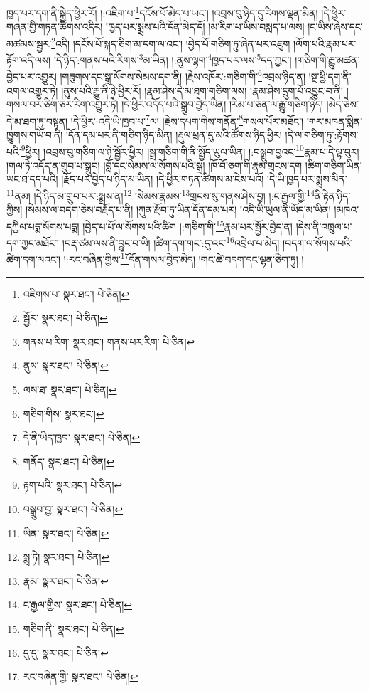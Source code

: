 ཁྱད་པར་དག་ནི་སྐྱེད་ཕྱིར་རོ། །:འཇིག་པ་\footnote{འཇིགས་པ་  སྣར་ཐང་།  པེ་ཅིན། }དངོས་པོ་མེད་པ་ཡང་། །འབྲས་བུ་ཉིད་དུ་རིགས་ལྡན་མིན། །དེ་ཕྱིར་གཞན་གྱི་གཏན་ཚིགས་འདིར། །ཁྱད་པར་སྨྲས་པའི་དོན་མེད་དོ། །མ་རིག་པ་ཡིས་བསླད་པ་ལས། །ང་ཡིས་ཞེས་དང་མཚམས་སྦྱར་\footnote{སྦྱོར་  སྣར་ཐང་།  པེ་ཅིན། }འདི། །དངོས་པོ་སྐད་ཅིག་མ་དག་ལ་འང་། །བྱེད་པོ་གཅིག་ཏུ་ཞེན་པར་འཇུག །ལོག་པའི་རྣམ་པར་རྟོག་འདི་ལས། །དེ་ཉིད་:གནས་པའི་རིགས་\footnote{གནས་པ་རིག་  སྣར་ཐང་། གནས་པར་རིག་  པེ་ཅིན། }མ་ཡིན། །:ནུས་ལྷག་\footnote{ནུས་  སྣར་ཐང་།  པེ་ཅིན། }ཁྱད་པར་ལས་\footnote{ལས་ཐ་  སྣར་ཐང་།  པེ་ཅིན། }དད་ཀྱང་། །གཅིག་གི་རྒྱུ་མཚན་བྱེད་པར་འགྱུར། །གཟུགས་དང་སྒྲ་སོགས་སེམས་དག་ནི། །རྗེས་འཁོར་:གཅིག་གི་\footnote{གཅིག་གིས་  སྣར་ཐང་། }འབྲས་ཉིད་ན། །སྔ་ཕྱི་དག་ནི་འགལ་འགྱུར་ཏེ། །ནུས་པའི་རྒྱུ་ནི་ཉེ་ཕྱིར་རོ། །རྣམ་ཤེས་དེ་མ་ཐག་གཅིག་ལས། །རྣམ་ཤེས་དྲུག་པོ་འབྱུང་བ་ནི། །གསལ་བར་ཅིག་ཅར་རིག་འགྱུར་ཏེ། །དེ་ཕྱིར་འདོད་པའི་སྒྲུབ་བྱེད་ཡིན། །རིམ་པ་ཅན་ལ་རྒྱུ་གཅིག་ཉིད། །མེད་ཅེས་དེ་མ་ཐག་ཏུ་བསྟན། །དེ་ཕྱིར་:འདི་ཡི་ཁྱབ་པ་\footnote{དེ་ནི་ཡིད་ཁྱབ་  སྣར་ཐང་།  པེ་ཅིན། }ལ། །རྗེས་དཔག་གིས་གནོན་\footnote{གནོད་  སྣར་ཐང་།  པེ་ཅིན། }གསལ་པོར་མཐོང་། །གར་མཁན་སྨིན་ཁྱུགས་གཡོ་བ་ནི། །དོན་དམ་པར་ནི་གཅིག་ཉིད་མིན། །རྡུལ་ཕྲན་དུ་མའི་ཚོགས་ཉིད་ཕྱིར། །དེ་ལ་གཅིག་ཏུ་:རྟོགས་པའི་\footnote{རྟག་པའི་  སྣར་ཐང་།  པེ་ཅིན། }ཕྱིར། །འབྲས་བུ་གཅིག་ལ་ཉེ་སྦྱོར་ཕྱིར། །སྒྲ་གཅིག་གི་ནི་སྤྱོད་ཡུལ་ཡིན། །:བསྒྲུབ་བྱའང་\footnote{བསྒྲུབ་བྱ་  སྣར་ཐང་།  པེ་ཅིན། }རྣམ་པ་དེ་ལྟ་བུར། །གལ་ཏེ་འདོད་ན་གྲུབ་པ་སྒྲུབ། །བློ་དང་སེམས་ལ་སོགས་པའི་སྒྲ། །ཁོ་བོ་ཅག་གི་རྣམ་གྲངས་དག །ཚིག་གཅིག་ཡིན་ཡང་ཐ་དད་པའི། །རྗོད་པར་བྱེད་པ་ཉིད་མ་ཡིན། །དེ་ཕྱིར་གཏན་ཚིགས་མ་ངེས་པའོ། །དེ་ཡི་ཁྱད་པར་སྨྲས་མིན་\footnote{ཡིན་  སྣར་ཐང་།  པེ་ཅིན། }ནམ། །དེ་ཉིད་མ་གྲུབ་པར་:སྨྲས་ན།\footnote{སྨྲ་ཏེ།  སྣར་ཐང་།  པེ་ཅིན། } །སེམས་རྣམས་\footnote{རྣམ་  སྣར་ཐང་།  པེ་ཅིན། }གྲངས་སུ་གནས་ཤེས་བྱ། །:ང་རྒྱལ་གྱི་\footnote{ང་རྒྱལ་གྱིས་  སྣར་ཐང་།  པེ་ཅིན། }ནི་རྟེན་ཉིད་ཀྱིས། །སེམས་ལ་བདག་ཅེས་བརྗོད་པ་ནི། །ཀུན་རྫོབ་ཏུ་ཡིན་དོན་དམ་པར། །འདི་ཡི་ཡུལ་ནི་ཡོད་མ་ཡིན། །མཁའ་དཀྱིལ་པདྨ་སོགས་པདྨ། །བྱེད་པ་པོ་ལ་སོགས་པའི་ཚིག །:གཅིག་གི་\footnote{གཅིག་ནི་  སྣར་ཐང་།  པེ་ཅིན། }རྣམ་པར་སྦྱོར་བྱེད་ན། །དེས་ནི་འཁྲུལ་པ་དག་ཀྱང་མཐོང་། །བརྡ་ཙམ་ལས་ནི་བྱུང་བ་ཡི། །ཚིག་དག་གང་:དུ་འང་\footnote{དུ་དུ་  སྣར་ཐང་།  པེ་ཅིན། }འབྲེལ་པ་མེད། །བདག་ལ་སོགས་པའི་ཚིག་དག་ལའང་། །:རང་བཞིན་གྱིས་\footnote{རང་བཞིན་གྱི་  སྣར་ཐང་།  པེ་ཅིན། }དོན་གསལ་བྱེད་མེད། །གང་ཚེ་བདག་དང་ལྷན་ཅིག་ཏུ། །
